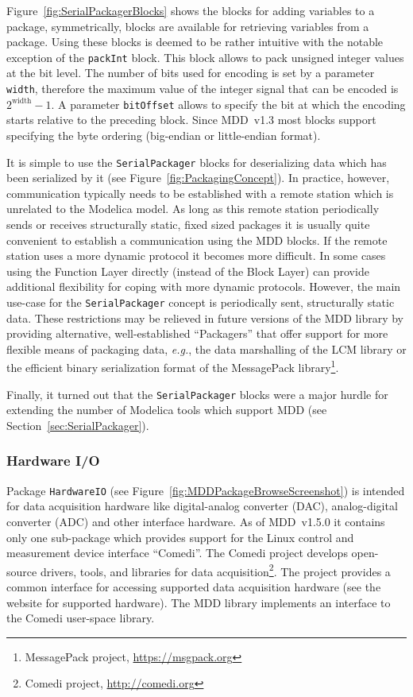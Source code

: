 \documentclass{resources/modelica}
\newcommand{\modelica}[1]{\lstinline[language=modelica]|#1|}
\begin{document}
\noindent
Figure~\ref{fig:SerialPackagerBlocks} shows the blocks for adding
variables to a package, symmetrically, blocks are available for retrieving variables from a
package. Using these blocks is deemed to be rather
intuitive with the notable exception of the \modelica{packInt} block. This
block allows to pack unsigned integer values at the bit level. The number of
bits used for encoding is set by a parameter \modelica{width}, therefore the maximum value
of the integer signal that can be encoded is $2^{\mathrm{width}} - 1$. A
parameter \modelica{bitOffset} allows to specify the bit at which the encoding starts
relative to the preceding block. Since MDD~v1.3 most blocks support specifying
the byte ordering (big-endian or little-endian format).

It is simple to use the
\modelica{SerialPackager} blocks for deserializing data which has been serialized by it
(see Figure~\ref{fig:PackagingConcept}). In practice, however, communication
typically needs to be established with a remote station which is unrelated to
the Modelica model. As long as this remote station periodically sends or
receives structurally static, fixed sized packages it is usually quite
convenient to establish a communication using the MDD blocks. If the remote
station uses a more dynamic protocol it becomes more difficult. In some cases
using the \textsf{Function Layer} directly (instead of the \textsf{Block Layer})
can provide additional flexibility for coping with more dynamic protocols.
However, the main use-case for the \modelica{SerialPackager} concept is periodically
sent, structurally static data. These restrictions may be relieved in
future versions of the MDD library by providing alternative, well-established ``Packagers'' that offer support for more
flexible means of packaging data, \textit{e.g.}, the data marshalling of the LCM library or
the efficient binary serialization format of the MessagePack library\footnote{MessagePack project,
\url{https://msgpack.org}}.

Finally, it turned out that the \modelica{SerialPackager} blocks were a major hurdle for
extending the number of Modelica tools which support MDD (see Section~\ref{sec:SerialPackager}).

\subsubsection{Hardware I/O}

Package \modelica{HardwareIO} (see
Figure~\ref{fig:MDDPackageBrowseScreenshot}) is intended for data acquisition
hardware like digital-analog converter (DAC), analog-digital converter (ADC) and
other interface hardware.
As of MDD~v1.5.0 it contains only one sub-package which
provides support for the Linux control and measurement device interface
``Comedi''. The Comedi project develops open-source drivers, tools, and
libraries for data acquisition\footnote{Comedi project,
\url{http://comedi.org}}. The project provides a common interface for
accessing supported data acquisition hardware (see the website for supported
hardware). The MDD library implements an interface to the Comedi user-space
library.
\end{document}
